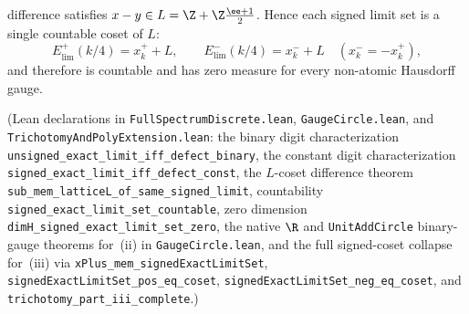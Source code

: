 \begin{theorem}
\begin{enumerate}[label=(\roman*),leftmargin=2em]
difference satisfies $x-y\in L=\Z+\Z\frac{\ee+1}{2}$. Hence each signed limit
set is a single countable coset of $L$:
\[
E_{\mathrm{lim}}^+(k/4)=x_k^+ + L,\qquad
E_{\mathrm{lim}}^-(k/4)=x_k^- + L\quad(x_k^-=-x_k^+),
\]
and therefore is countable and has zero measure for every non-atomic Hausdorff
gauge.
\end{enumerate}
(Lean declarations in \texttt{Full\allowbreak Spectrum\allowbreak Discrete.lean},
\texttt{Gauge\allowbreak Circle.lean}, and
\texttt{Trichotomy\allowbreak And\allowbreak Poly\allowbreak Extension.lean}:
the binary digit characterization \texttt{unsigned\_\allowbreak exact\_\allowbreak limit\_\allowbreak iff\_\allowbreak defect\_\allowbreak binary},
the constant digit characterization \texttt{signed\_\allowbreak exact\_\allowbreak limit\_\allowbreak iff\_\allowbreak defect\_\allowbreak const},
the $L$-coset difference theorem \texttt{sub\_\allowbreak mem\_\allowbreak latticeL\_\allowbreak of\_\allowbreak same\_\allowbreak signed\_\allowbreak limit},
countability \texttt{signed\_\allowbreak exact\_\allowbreak limit\_\allowbreak set\_\allowbreak countable},
zero dimension \texttt{dimH\_\allowbreak signed\_\allowbreak exact\_\allowbreak limit\_\allowbreak set\_\allowbreak zero},
the native $\R$ and \texttt{UnitAddCircle} binary-gauge theorems for~(ii) in \texttt{GaugeCircle.lean},
and the full signed-coset collapse for~(iii) via
\texttt{xPlus\_\allowbreak mem\_\allowbreak signed\allowbreak Exact\allowbreak LimitSet},
\texttt{signed\allowbreak Exact\allowbreak LimitSet\_\allowbreak pos\_\allowbreak eq\_\allowbreak coset},
\texttt{signed\allowbreak Exact\allowbreak LimitSet\_\allowbreak neg\_\allowbreak eq\_\allowbreak coset}, and
\texttt{trichotomy\_\allowbreak part\_\allowbreak iii\_\allowbreak complete}.)
\end{theorem}

